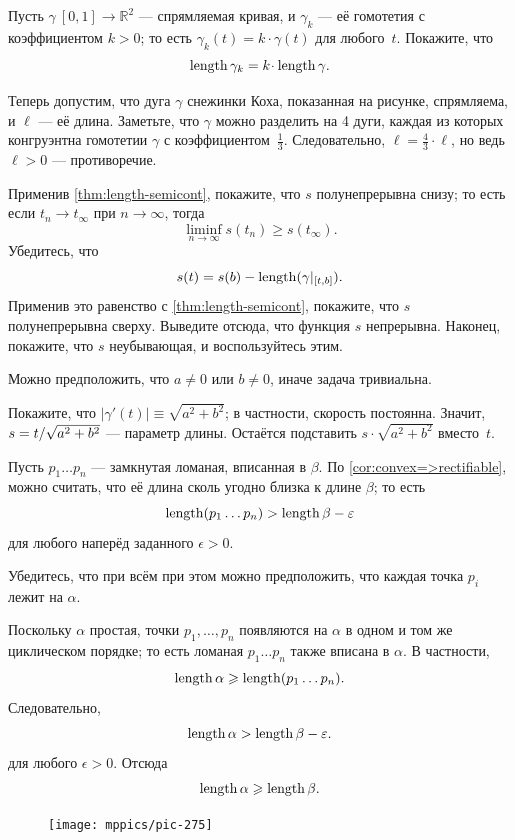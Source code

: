 \begin{multicols}{2}
Пусть $\gamma\:[0,1]\to\mathbb{R}^2$ --- спрямляемая кривая, и $\gamma_k$ --- её гомотетия с коэффициентом $k>0$;
то есть $\gamma_k(t)=k\cdot\gamma(t)$ для любого~$t$.
Покажите, что 
\[\length\gamma_k=k\cdot\length \gamma.\]

Теперь допустим, что дуга $\gamma$ снежинки Коха, показанная на рисунке, спрямляема,
и $\ell$ --- её длина.
Заметьте, что $\gamma$ можно разделить на 4 дуги, каждая из которых конгруэнтна гомотетии $\gamma$ с коэффициентом~$\tfrac13$.
Следовательно, $\ell=\tfrac43\cdot\ell$,
но ведь $\ell>0$ --- противоречие.

Применив \ref{thm:length-semicont}, покажите, что $s$ полунепрерывна снизу;
то есть если $t_n\to t_\infty$ при $n\to\infty$, тогда 
\[\liminf_{n\to\infty} s(t_n)\ge s(t_\infty).\]
Убедитесь, что
\[s(t)=s(b)-\mathop{\rm length}\nolimits(\gamma|_{[t,b]}).\]
Применив это равенство с \ref{thm:length-semicont}, покажите, что $s$ полунепрерывна сверху.
Выведите отсюда, что функция $s$ непрерывна.
Наконец, покажите, что $s$ неубывающая, 
и воспользуйтесь этим.

Можно предположить, что $a\ne 0$ или $b\ne 0$,
иначе задача тривиальна.

Покажите, что $|\gamma'(t)|\equiv \sqrt{a^2+b^2}$;
в частности, скорость постоянна.
Значит, $s\z=t/\sqrt{a^2+b^2}$ --- параметр длины.
Остаётся подставить $s\cdot \sqrt{a^2+b^2}$ вместо~$t$.


Пусть $p_1\dots p_n$ --- замкнутая ломаная, вписанная в $\beta$.
По \ref{cor:convex=>rectifiable}, можно считать, что её длина сколь угодно близка к длине $\beta$;
то есть
\[\mathop{\rm length}\nolimits (p_1\dots p_n)>\mathop{\rm length}\nolimits\beta-\varepsilon\]
для любого наперёд заданного $\epsilon>0$.

Убедитесь, что при всём при этом можно предположить, что каждая точка $p_i$ лежит на $\alpha$.

Поскольку $\alpha$ простая, точки $p_1,\dots,p_n$ появляются на $\alpha$ в одном и том же циклическом порядке;
то есть ломаная $p_1\dots p_n$ также вписана в $\alpha$.
В частности,
\[\mathop{\rm length}\nolimits\alpha\geqslant \mathop{\rm length}\nolimits (p_1\dots p_n).\]
Следовательно, 
\[\mathop{\rm length}\nolimits\alpha>\mathop{\rm length}\nolimits\beta-\varepsilon.\]
для любого $\epsilon>0$.
Отсюда
\[\mathop{\rm length}\nolimits\alpha\geqslant\mathop{\rm length}\nolimits\beta.\]

\begin{figure}
\vskip-0mm
\centering
\texttt{[image: mppics/pic-275]}
\vskip0mm
\end{figure}


\end{multicols}
